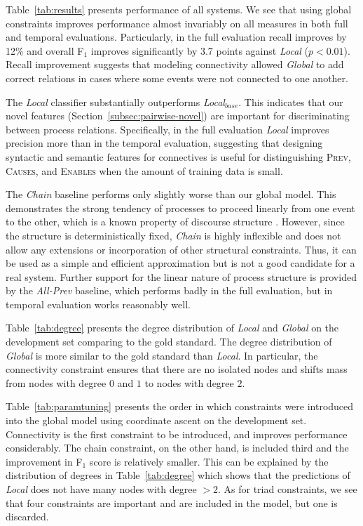 Table~\ref{tab:results} presents performance of all systems. We see that using global constraints improves performance almost invariably on all measures in both full and temporal evaluations. Particularly, in the full evaluation recall improves by 12\% and overall F$_1$ improves significantly by 3.7 points against \emph{Local} ($p<0.01$). Recall improvement suggests that modeling connectivity allowed \emph{Global} to add correct relations in cases where some events were not connected to one another.

The \emph{Local} classifier substantially outperforms \emph{Local$_{base}$}. This indicates that our novel features (Section~\ref{subsec:pairwise-novel}) are important for discriminating between process relations. Specifically, in the full evaluation \emph{Local} improves precision more than in the temporal evaluation, suggesting that designing syntactic and semantic features for connectives is useful for distinguishing \textsc{Prev}, \textsc{Causes}, and \textsc{Enables} when the amount of training data is small.

The \emph{Chain} baseline performs only slightly worse than our global model. This demonstrates the strong tendency of processes to proceed linearly from one event to the other, which is a known property of discourse structure \cite{schegloff73}.  However, since the structure is deterministically fixed, \emph{Chain} is highly inflexible and does not allow any extensions or incorporation of other structural constraints. Thus, it can be used as a simple and efficient approximation but is not a good candidate for a real system. Further support for the linear nature of process structure is provided by the \emph{All-Prev} baseline, which performs badly in the full evaluation, but in temporal evaluation works reasonably well. 

Table~\ref{tab:degree} presents the degree distribution of \emph{Local} and \emph{Global} on the development set comparing to the gold standard. The degree distribution of \emph{Global} is  more similar to the gold standard than \emph{Local}. In particular, the connectivity constraint ensures that there are no isolated nodes and shifts mass from nodes with degree $0$ and $1$ to nodes with degree $2$.

Table~\ref{tab:paramtuning} presents the order in which constraints were introduced into the global model using coordinate ascent on the development set. Connectivity is the first constraint to be introduced, and improves performance considerably. The chain constraint, on the other hand, is included third and the improvement in F$_{1}$ score is relatively smaller. This can be explained by the distribution of degrees in Table~\ref{tab:degree} which shows that the predictions of \emph{Local} does not have many nodes with degree $>2$. As for triad constraints, we see that four constraints are important and are included in the model, but one is discarded.

